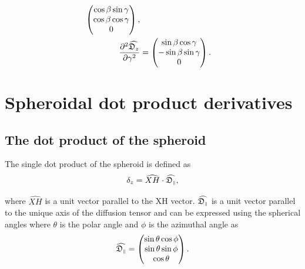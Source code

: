 \begin{subequations}
\begin{align}
\begin{pmatrix}
        \cos \beta \sin \gamma \\
        \cos \beta \cos \gamma \\
        0 \\
    \end{pmatrix}, \\
    \frac{\partial^2 \widehat{\mathfrak{D}_z}}{\partial \gamma^2} &= \begin{pmatrix}
        \sin \beta \cos \gamma \\
        -\sin \beta \sin \gamma \\
        0 \\
    \end{pmatrix}.
\end{align}
\end{subequations}





\newpage
\section{Spheroidal dot product derivatives}




\subsection{The dot product of the spheroid}

The single dot product of the spheroid is defined as
\begin{equation}
    \delta_z = \widehat{XH} \cdot \widehat{\mathfrak{D}_{\scriptscriptstyle \parallel}},
\end{equation}

\noindent where $\widehat{XH}$ is a unit vector parallel to the XH vector.
$\widehat{\mathfrak{D}_{\scriptscriptstyle \parallel}}$ is a unit vector parallel to the unique axis of the diffusion tensor and can be expressed using the spherical angles where $\theta$ is the polar angle and $\phi$ is the azimuthal angle as
\begin{equation}
    \widehat{\mathfrak{D}_{\scriptscriptstyle \parallel}} = \begin{pmatrix}
        \sin \theta \cos \phi \\
        \sin \theta \sin \phi \\
        \cos \theta \\
    \end{pmatrix}.
\end{equation}



